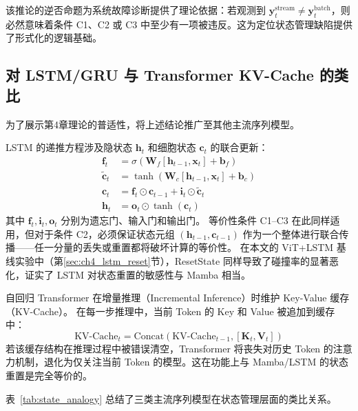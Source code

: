 该推论的逆否命题为系统故障诊断提供了理论依据：若观测到 $\mathbf{y}_t^{\text{stream}} \neq \mathbf{y}_t^{\text{batch}}$，则必然意味着条件 C1、C2 或 C3 中至少有一项被违反。这为定位状态管理缺陷提供了形式化的逻辑基础。

\subsection{对 LSTM/GRU 与 Transformer KV-Cache 的类比}

为了展示第4章理论的普适性，将上述结论推广至其他主流序列模型。

\begin{corollary}
LSTM 的递推方程涉及隐状态 $\mathbf{h}_t$ 和细胞状态 $\mathbf{c}_t$ 的联合更新：
\begin{align}
  \mathbf{f}_t &= \sigma(\mathbf{W}_f [\mathbf{h}_{t-1}, \mathbf{x}_t] + \mathbf{b}_f) \nonumber \\
  \tilde{\mathbf{c}}_t &= \tanh(\mathbf{W}_c [\mathbf{h}_{t-1}, \mathbf{x}_t] + \mathbf{b}_c) \nonumber \\
  \mathbf{c}_t &= \mathbf{f}_t \odot \mathbf{c}_{t-1} + \mathbf{i}_t \odot \tilde{\mathbf{c}}_t \nonumber \\
  \mathbf{h}_t &= \mathbf{o}_t \odot \tanh(\mathbf{c}_t)
  \label{eq:lstm_recurrence}
\end{align}
其中 $\mathbf{f}_t, \mathbf{i}_t, \mathbf{o}_t$ 分别为遗忘门、输入门和输出门。
等价性条件 C1--C3 在此同样适用，但对于条件 C2，必须保证状态元组 $(\mathbf{h}_{t-1}, \mathbf{c}_{t-1})$ 作为一个整体进行联合传播——任一分量的丢失或重置都将破坏计算的等价性。
在本文的 ViT+LSTM 基线实验中（第\ref{sec:ch4_lstm_reset}节），ResetState 同样导致了碰撞率的显著恶化，证实了 LSTM 对状态重置的敏感性与 Mamba 相当。
\end{corollary}

\begin{corollary}
自回归 Transformer 在增量推理（Incremental Inference）时维护 Key-Value 缓存（KV-Cache）。
在每一步推理中，当前 Token 的 Key 和 Value 被追加到缓存中：
\begin{equation}
  \text{KV-Cache}_t = \text{Concat}(\text{KV-Cache}_{t-1}, [\mathbf{K}_t, \mathbf{V}_t])
\end{equation}
若该缓存结构在推理过程中被错误清空，Transformer 将丧失对历史 Token 的注意力机制，退化为仅关注当前 Token 的模型。这在功能上与 Mamba/LSTM 的状态重置是完全等价的。
\end{corollary}

表~\ref{tab:state_analogy} 总结了三类主流序列模型在状态管理层面的类比关系。

